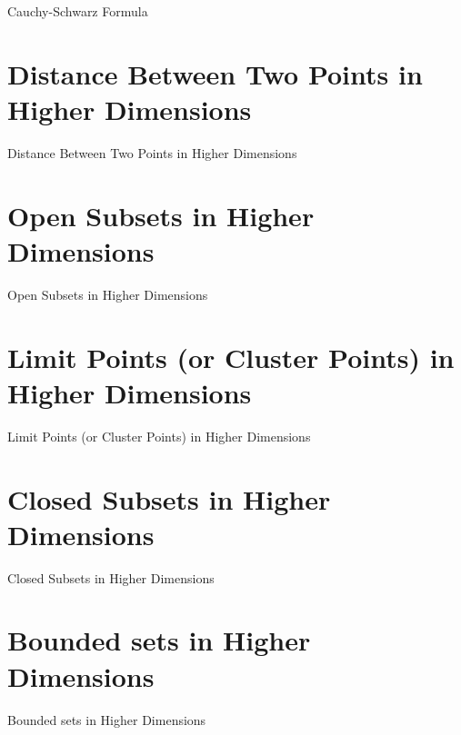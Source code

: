 Cauchy-Schwarz Formula

\section{Distance Between Two Points in Higher Dimensions}
\label{sec:distance-between-two-points-in-higher-dimensions}

Distance Between Two Points in Higher Dimensions

\section{Open Subsets in Higher Dimensions}
\label{sec:open-subsets-in-higher-dimensions}

Open Subsets in Higher Dimensions

\section{Limit Points (or Cluster Points) in Higher Dimensions}
\label{sec:limit-points-or-cluster-points-in-higher-dimensions}

Limit Points (or Cluster Points) in Higher Dimensions

\section{Closed Subsets in Higher Dimensions}
\label{sec:closed-subsets-in-higher-dimensions}

Closed Subsets in Higher Dimensions

\section{Bounded sets in Higher Dimensions}
\label{sec:bounded-sets-in-higher-dimensions}

Bounded sets in Higher Dimensions

